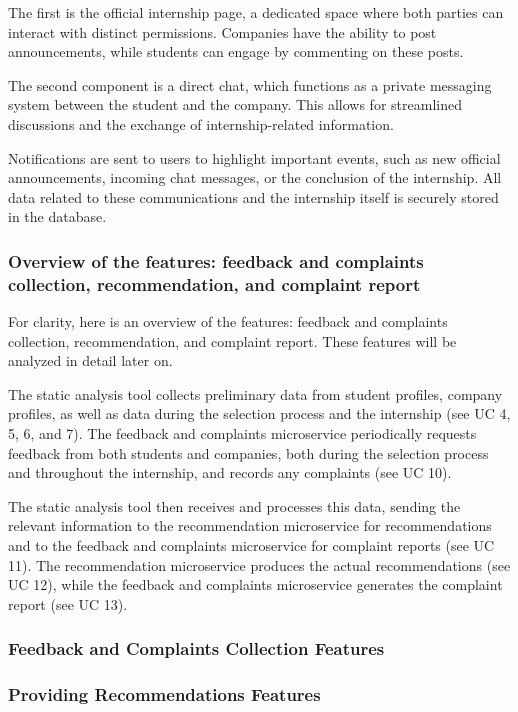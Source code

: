 The first is the official
internship page, a dedicated space where both parties can interact with distinct permissions.
Companies have the ability to post announcements, while students can engage by commenting on
these posts. 

The second component is a direct chat, which functions as a private messaging system between
the student and the company. This allows for streamlined discussions and the exchange of
internship-related information.

Notifications are sent to users to highlight important events, such as new official
announcements, incoming chat messages, or the conclusion of the internship. All data
related to these communications and the internship itself is securely stored in the database.

\subsubsection{Overview of the features: feedback and complaints collection, recommendation,
and complaint report}

For clarity, here is an overview of the features: feedback and complaints collection,
recommendation, and complaint report. These features will be analyzed in detail later on.

The static analysis tool collects preliminary data from student profiles, company profiles,
as well as data during the selection process and the internship (see UC 4, 5, 6, and 7).
The feedback and complaints microservice periodically requests feedback from both students
and companies, both during the selection process and throughout the internship, and records
any complaints (see UC 10).

The static analysis tool then receives and processes this data, sending the relevant
information to the recommendation microservice for recommendations and to the feedback
and complaints microservice for complaint reports (see UC 11). The recommendation
microservice produces the actual recommendations (see UC 12), while the feedback
and complaints microservice generates the complaint report (see UC 13).

\subsubsection{Feedback and Complaints Collection Features}
\subsubsection{Providing Recommendations Features}
